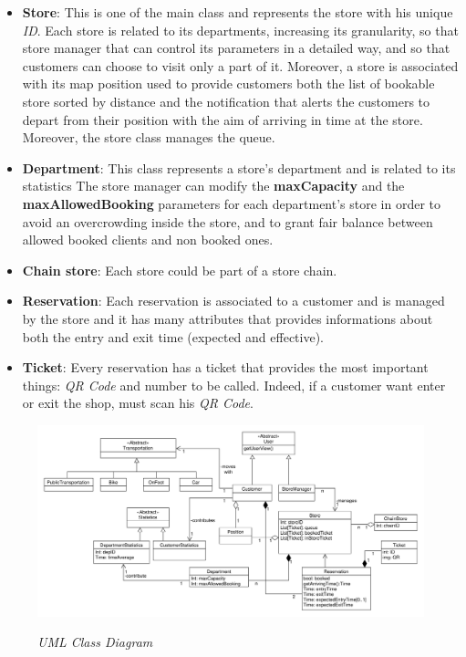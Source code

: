 \documentclass{article}
\begin{document}
\begin{itemize}
\begin{itemize}
				\end{itemize}
			
				\item {\bfseries Store}: This is one of the main class and represents the store with his unique \emph{ID}. Each store is related to its departments, increasing its granularity, so that store manager that can control its parameters in a detailed way, and so that customers can choose to visit only a part of it. Moreover, a store is associated with its map position used to provide customers both the list of bookable store sorted by distance and the notification that alerts the customers to depart from their position with the aim of arriving in time at the store. Moreover, the store class manages the queue.
				
				\item {\bfseries Department}: This class represents a store's department and is related to its statistics The store manager can modify the {\bfseries maxCapacity} and the {\bfseries maxAllowedBooking} parameters for each department's store in order to avoid an overcrowding inside the store, and to grant fair balance between allowed booked clients and non booked ones.
				
				\item {\bfseries Chain store}: Each store could be part of a store chain.
				
				\item {\bfseries Reservation}: Each reservation is associated to a customer and is managed by the store and it has many attributes that provides informations about both the entry and exit time (expected and effective).
				
				\item {\bfseries Ticket}: Every reservation has a ticket that provides the most important things: \emph{QR Code} and number to be called. Indeed, if a customer want enter or exit the shop, must scan his \emph{QR Code}.
			\end{itemize}
		
			\begin{figure}
			\begin{adjustwidth}{-3cm}{}
				\centering
				\includegraphics[scale=0.45, angle=90, trim= 0 0 0 -5cm]{ClassDiagrams/classDiagram.pdf} \\
				\caption{\emph{UML Class Diagram}}
			\end{adjustwidth}
		\end{figure}
	
\end{document}
